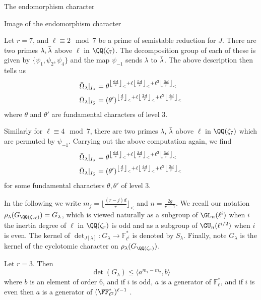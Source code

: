 \documentclass[11pt,a4paper]{article}
\newcommand{\Fl}{\mathbb{F}_\ell}
\newcommand{\Fli}{\mathbb{F}_{\ell^i}}
\newcommand{\Qr}{{\QQ(\zeta_r)}}
\newcommand{\GQr}{G_{\QQ(\zeta_{r})}}
\newcommand{\GQrl}{G_{\QQ(\zeta_{r\ell})}}
\newcommand{\Glam}{G_{\lambda}}
\newcommand{\Slam}{S_{\lambda}}
\begin{document}
\begin{section}{The endomorphism character}
\begin{subsection}{Image of the endomorphism character}
\begin{example}
Let $r=7$, and $\ell \equiv 2 \mod{7}$ be a prime of semistable reduction for $J$. There are two primes $\lambda, \Bar{\lambda}$ above $\ell$ in $\QQ(\zeta_7)$. The decomposition group of each of these is given by $\{\psi_{1},\psi_{2},\psi_{4}\}$ and the map $\psi_{-1}$ sends $\lambda$ to $\Bar{\lambda}$. The above description then tells us
\begin{align*}
    \Bar{\Omega}_\lambda|_{I_\lambda} &= \theta^{\left\lfloor \frac{6d}{r}\right\rfloor_< + \ell \left\lfloor \frac{5d}{r}\right\rfloor_<  + \ell^2\left\lfloor \frac{3d}{r}\right\rfloor_<}\\
    \Bar{\Omega}_\lambda|_{I_{\Bar{\lambda}}} &= (\theta')^{\left\lfloor \frac{d}{r}\right\rfloor_< + \ell \left\lfloor \frac{2d}{r}\right\rfloor_<  + \ell^2 \left\lfloor \frac{4d}{r}\right\rfloor_<}
\end{align*}
where $\theta$ and $\theta'$ are fundamental characters of level $3$.

Similarly for $\ell \equiv 4 \mod{7}$, there are two primes $\lambda$, $\Bar{\lambda}$ above $\ell$ in $\QQ(\zeta_7)$ which are permuted by $\psi_{-1}$. Carrying out the above computation again, we find
\begin{align*}
    \Bar{\Omega}_\lambda|_{I_\lambda} &= \theta^{\left\lfloor \frac{6d}{r}\right\rfloor_< + \ell \left\lfloor \frac{3d}{r}\right\rfloor_<  + \ell^2 \left\lfloor \frac{5d}{r}\right\rfloor_< }\\
    \Bar{\Omega}_\lambda|_{I_{\Bar{\lambda}}} &= (\theta')^{\left\lfloor \frac{d}{r}\right\rfloor_< + \ell \left\lfloor \frac{4d}{r}\right\rfloor_<  + \ell^2 \left\lfloor \frac{2d}{r}\right\rfloor_< }
\end{align*}
for some fundamental characters $\theta, \theta'$ of level $3$.
\end{example}


In the following we write $m_j = \lfloor \frac{(r-j)d}{r} \rfloor_<$ and $n=\frac{2g}{r-1}$.
We recall our notation $\rho_\lambda(\GQrl)=\Glam$, which is viewed naturally as a subgroup of $\GL_n(\ell^i)$ when $i$ the inertia degree of $\ell$ in $\Qr$ is odd and as a subgroup of $\GU_n(\ell^{i/2})$ when $i$ is even. The kernel of $\det_{J[\lambda]}\colon\Glam \rightarrow \Fli^*$ is denoted by $\Slam$.
Finally, note $\Glam$ is the kernel of the cyclotomic character on $\rho_\lambda(\GQr)$. 

\begin{lemma}
\label{Lem_upper_bound_on_Glam}
Let $r =3$. Then
\[\det(\Glam) \leq \langle a^{m_1-m_2},b\rangle 
\] where $b$ is an element of order $6$, and if $i$ is odd, $a$ is a generator of $\Fl^*$, and if $i$ is even then $a$ is a generator of $(\FF_{\ell^2}^*)^{\ell-1}$ .
\end{lemma}


\end{subsection}
\end{section}
\end{document}
